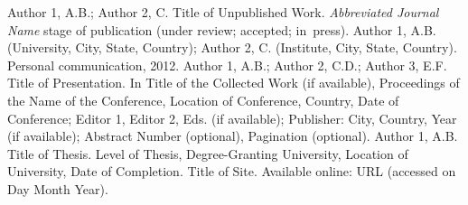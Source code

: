 \documentclass[journal,article,submit,moreauthors,pdftex]{Definitions/mdpi}
\begin{document}
\begin{thebibliography}{999}
Author 1, A.B.; Author 2, C. Title of Unpublished Work. \textit{Abbreviated Journal Name} stage of publication (under review; accepted; in~press).
Author 1, A.B. (University, City, State, Country); Author 2, C. (Institute, City, State, Country). Personal communication, 2012.
Author 1, A.B.; Author 2, C.D.; Author 3, E.F. Title of Presentation. In Title of the Collected Work (if available), Proceedings of the Name of the Conference, Location of Conference, Country, Date of Conference; Editor 1, Editor 2, Eds. (if available); Publisher: City, Country, Year (if available); Abstract Number (optional), Pagination (optional).
Author 1, A.B. Title of Thesis. Level of Thesis, Degree-Granting University, Location of University, Date of Completion.
Title of Site. Available online: URL (accessed on Day Month Year).
\end{thebibliography}

%


\end{document}
